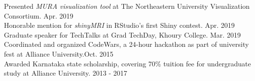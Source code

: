 \documentclass[a4paper]{article}
\newcommand{\mybullet}{
	\indent \textbullet \hspace*{2mm}
}
\begin{document}
    \mybullet Presented \textit{MURA visualization tool} at The Northeastern University 
    Visualization Consortium. \hfill Apr. 2019 \\
    \mybullet Honorable mention for \textit{shinyMRI} in RStudio's first Shiny contest. 
    \hfill Apr. 2019 \\
    \mybullet Graduate speaker for TechTalks at Grad TechDay, Khoury College. \hfill Mar. 2019 \\
		\mybullet Coordinated and organized CodeWars, a 24-hour hackathon as part of 
		university fest at Alliance University.\hfill Oct. 2015\\
		\mybullet Awarded Karnataka state scholarship, covering 70\% tuition fee for undergraduate 
		study at Alliance University. \hfill 2013 - 2017 \\
		
\end{document}
